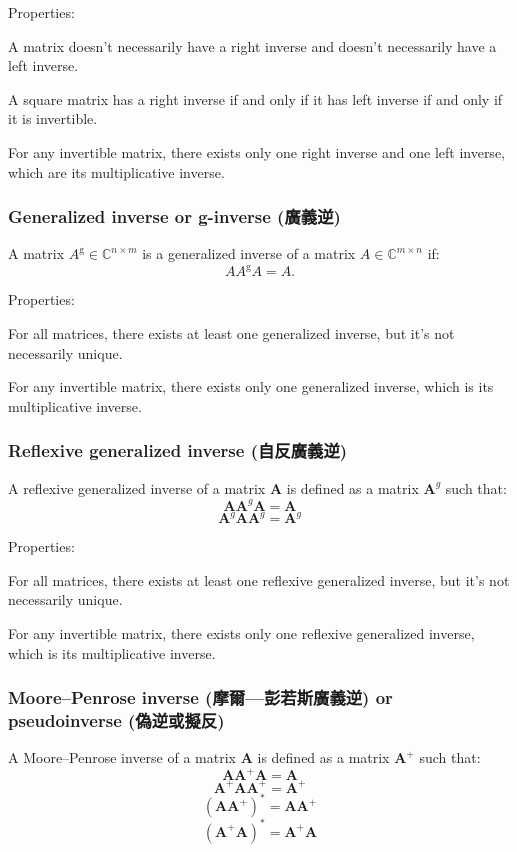 \documentclass[a4paper,12pt]{report}
\begin{document}
Properties:
\bit
\item A matrix doesn't necessarily have a right inverse and doesn't necessarily have a left inverse.
\item A square matrix has a right inverse if and only if it has left inverse if and only if it is invertible.
\item For any invertible matrix, there exists only one right inverse and one left inverse, which are its multiplicative inverse.
\eit
\subsubsection{Generalized inverse or g-inverse (廣義逆)}
A matrix $A^{\mathrm {g} }\in \mathbb {C} ^{n\times m}$ is a generalized inverse of a matrix $A\in \mathbb {C} ^{m\times n}$ if:
\[AA^{\mathrm {g} }A=A.\]

Properties:
\bit
\item For all matrices, there exists at least one generalized inverse, but it's not necessarily unique.
\item For any invertible matrix, there exists only one generalized inverse, which is its multiplicative inverse.
\eit
\subsubsection{Reflexive generalized inverse (自反廣義逆)}
A reflexive generalized inverse of a matrix $\mathbf{A}$ is defined as a matrix $\mathbf{A}^g$ such that:
\[\mathbf{A}\mathbf{A}^g\mathbf{A}=\mathbf{A}\]
\[\mathbf{A}^g\mathbf{A}\mathbf{A}^g=\mathbf{A}^g\]

Properties:
\bit
\item For all matrices, there exists at least one reflexive generalized inverse, but it's not necessarily unique.
\item For any invertible matrix, there exists only one reflexive generalized inverse, which is its multiplicative inverse.
\eit
\subsubsection{Moore–Penrose inverse (摩爾—彭若斯廣義逆) or pseudoinverse (偽逆或擬反)}
A Moore–Penrose inverse of a matrix $\mathbf{A}$ is defined as a matrix $\mathbf{A}^+$ such that:
\[\mathbf{A}\mathbf{A}^+\mathbf{A}=\mathbf{A}\]
\[\mathbf{A}^+\mathbf{A}\mathbf{A}^+=\mathbf{A}^+\]
\[\left(\mathbf{A}\mathbf{A}^{+}\right)^{*}=\mathbf{A}\mathbf{A}^{+}\]
\[\left(\mathbf{A}^+\mathbf{A}\right)^{*}=\mathbf{A}^+\mathbf{A}\]
\end{document}
